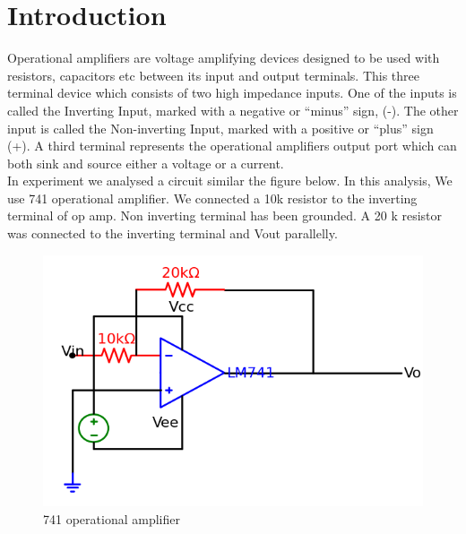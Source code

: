 \documentclass[12pt]{article}
\begin{document}
\section{Introduction}
\large Operational amplifiers are voltage amplifying devices designed to be used with resistors, capacitors etc between its input and output terminals. This three terminal device which consists of two high impedance inputs. One of the inputs is called the Inverting Input, marked with a negative or “minus” sign, (-). The other input is called the Non-inverting Input, marked with a positive or “plus” sign (+). A third terminal represents the operational amplifiers output port which can both sink and source either a voltage or a current.\\
\large In experiment we analysed a circuit similar the figure below. In this analysis, We use 741 operational amplifier. We connected a 10k resistor to the inverting terminal of op amp. Non inverting terminal has been grounded. A 20 k resistor was connected to the inverting terminal and Vout parallelly.\\ 

\begin{figure}
    \centering
    \includegraphics[scale=1.2]{elec_lab-1.png}
    \caption{741 operational amplifier}
    \label{fig:Op amp}
\end{figure}
\pagebreak
\end{document}
